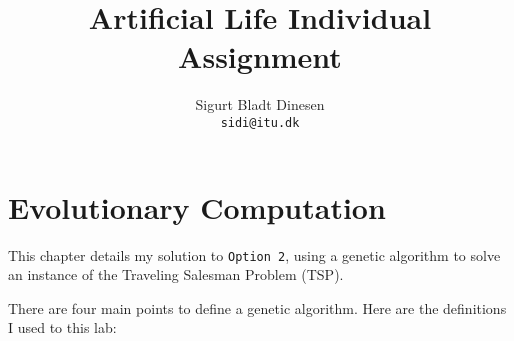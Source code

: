 \documentclass[a4paper, titlepage]{report}
\renewcommand{\%}{\scalebox{.9}{\oldpct}}
\begin{document}
\title{Artificial Life Individual Assignment}
\author{
	Sigurt Bladt Dinesen
	\\\texttt{sidi@itu.dk}
}

\maketitle

\tableofcontents
\chapter{Evolutionary Computation}
This chapter details my solution to \texttt{Option 2}, using a genetic algorithm
to solve an instance of the Traveling Salesman Problem (TSP).

There are four main points to define a genetic algorithm. Here are the
definitions I used to this lab:
\end{document}
